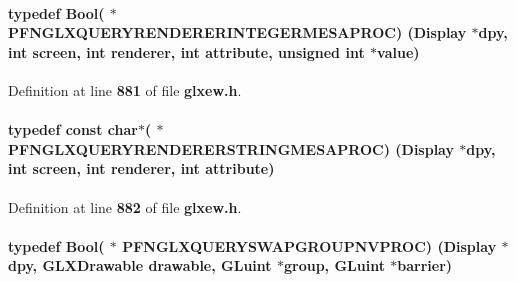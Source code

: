 \paragraph[{P\+F\+N\+G\+L\+X\+Q\+U\+E\+R\+Y\+R\+E\+N\+D\+E\+R\+E\+R\+I\+N\+T\+E\+G\+E\+R\+M\+E\+S\+A\+P\+R\+OC}]{\setlength{\rightskip}{0pt plus 5cm}typedef Bool( $\ast$  P\+F\+N\+G\+L\+X\+Q\+U\+E\+R\+Y\+R\+E\+N\+D\+E\+R\+E\+R\+I\+N\+T\+E\+G\+E\+R\+M\+E\+S\+A\+P\+R\+OC) (Display $\ast$dpy, {\bf int} screen, {\bf int} renderer, {\bf int} attribute, unsigned {\bf int} $\ast$value)}\label{glxew_8h_a48a5dd62544a7195395f4024e35b6deb}


Definition at line {\bf 881} of file {\bf glxew.\+h}.

\paragraph[{P\+F\+N\+G\+L\+X\+Q\+U\+E\+R\+Y\+R\+E\+N\+D\+E\+R\+E\+R\+S\+T\+R\+I\+N\+G\+M\+E\+S\+A\+P\+R\+OC}]{\setlength{\rightskip}{0pt plus 5cm}typedef const char$\ast$( $\ast$  P\+F\+N\+G\+L\+X\+Q\+U\+E\+R\+Y\+R\+E\+N\+D\+E\+R\+E\+R\+S\+T\+R\+I\+N\+G\+M\+E\+S\+A\+P\+R\+OC) (Display $\ast$dpy, {\bf int} screen, {\bf int} renderer, {\bf int} attribute)}\label{glxew_8h_a69daf95fcb84f30b4f7645370279e4ab}


Definition at line {\bf 882} of file {\bf glxew.\+h}.

\paragraph[{P\+F\+N\+G\+L\+X\+Q\+U\+E\+R\+Y\+S\+W\+A\+P\+G\+R\+O\+U\+P\+N\+V\+P\+R\+OC}]{\setlength{\rightskip}{0pt plus 5cm}typedef Bool( $\ast$  P\+F\+N\+G\+L\+X\+Q\+U\+E\+R\+Y\+S\+W\+A\+P\+G\+R\+O\+U\+P\+N\+V\+P\+R\+OC) (Display $\ast$dpy, {\bf G\+L\+X\+Drawable} drawable, {\bf G\+Luint} $\ast${\bf group}, {\bf G\+Luint} $\ast${\bf barrier})}\label{glxew_8h_a48fd381bf18e46144e6cafc36133d5d4}



